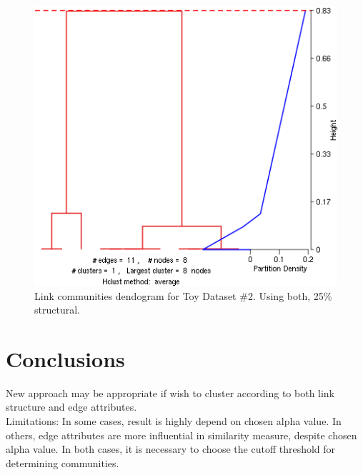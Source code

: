 \documentclass{report} %
\begin{document}
\begin{figure}[htp!]
  \centering
  \includegraphics[width=0.6\linewidth]{toy3/ea/lc_0.25.png}
  \caption{Link communities dendogram for Toy Dataset \#2. Using both, 25\% structural.}
\end{figure}


\section*{Conclusions}

New approach may be appropriate if wish to cluster according to both link structure and edge attributes.\\

Limitations: In some cases, result is highly depend on chosen alpha value. In others, edge attributes are more influential in similarity measure, despite chosen alpha value. In both cases, it is necessary to choose the cutoff threshold for determining communities.

\nocite{DBLP:journals/corr/abs-1201-6568}
\nocite{ahn-lehmann-link-communities-nature-2010}
\nocite{Salem:2013:MMF:2500863.2500869}



\end{document}
